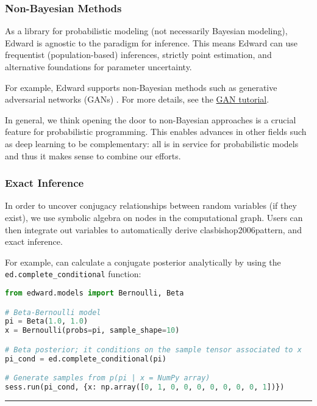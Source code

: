 \subsubsection{Non-Bayesian Methods}

As a library for probabilistic modeling (not necessarily Bayesian
modeling), Edward is agnostic to the paradigm for inference.  This
means Edward can use frequentist (population-based) inferences,
strictly point estimation, and alternative foundations for parameter
uncertainty.

For example, Edward supports non-Bayesian methods such as generative
adversarial networks (GANs)
\citep{goodfellow2014generative}.
For more details, see the \href{/tutorials/gan}{GAN tutorial}.

In general, we think opening the door to non-Bayesian approaches is a
crucial feature for probabilistic programming. This enables advances
in other fields such as deep learning to be complementary: all is in
service for probabilistic models and thus it makes sense to combine
our efforts.

\subsubsection{Exact Inference}

In order to uncover conjugacy relationships between random variables
(if they exist), we use symbolic algebra on nodes in the computational
graph.  Users can then integrate out variables to automatically derive
clas{bishop2006pattern}, and exact inference.

For example,  can calculate a conjugate posterior analytically by
using the \texttt{ed.complete_conditional} function:

\begin{lstlisting}[language=Python]
from edward.models import Bernoulli, Beta

# Beta-Bernoulli model
pi = Beta(1.0, 1.0)
x = Bernoulli(probs=pi, sample_shape=10)

# Beta posterior; it conditions on the sample tensor associated to x
pi_cond = ed.complete_conditional(pi)

# Generate samples from p(pi | x = NumPy array)
sess.run(pi_cond, {x: np.array([0, 1, 0, 0, 0, 0, 0, 0, 0, 1])})
\end{lstlisting}

\begin{center}\rule{3in}{0.4pt}\end{center}

